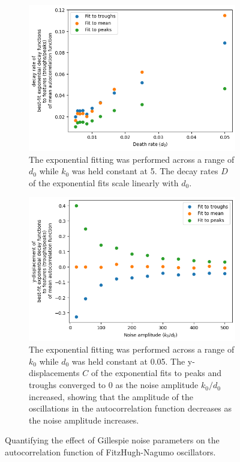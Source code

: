 \begin{figure}
  \begin{subfigure}[t]{0.45\textwidth}
  \centering
    \includegraphics[width=\linewidth]{fhn_deathrate_vs_decay.png}
    \caption{
      The exponential fitting was performed across a range of $d_{0}$ while $k_{0}$ was held constant at 5.
      The decay rates $D$ of the exponential fits scale linearly with $d_{0}$.
    }
    \label{fig:acf-fhn-noiseparams-noisetimescale}
  \end{subfigure}%
  \begin{subfigure}[t]{0.45\textwidth}
  \centering
    \includegraphics[width=\linewidth]{fhn_birthrate_vs_ydispl.png}
    \caption{
      The exponential fitting was performed across a range of $k_{0}$ while $d_{0}$ was held constant at 0.05.
      The y-displacements $C$ of the exponential fits to peaks and troughs converged to 0 as the noise amplitude $k_{0}/d_{0}$ increased, showing that the amplitude of the oscillations in the autocorrelation function decreases as the noise amplitude increases.
    }
    \label{fig:acf-fhn-noiseparams-noiseamplitude}
  \end{subfigure}

  \caption{
    Quantifying the effect of Gillespie noise parameters on the autocorrelation function of FitzHugh-Nagumo oscillators.
  }
  \label{fig:acf-fhn-noiseparams}
\end{figure}

